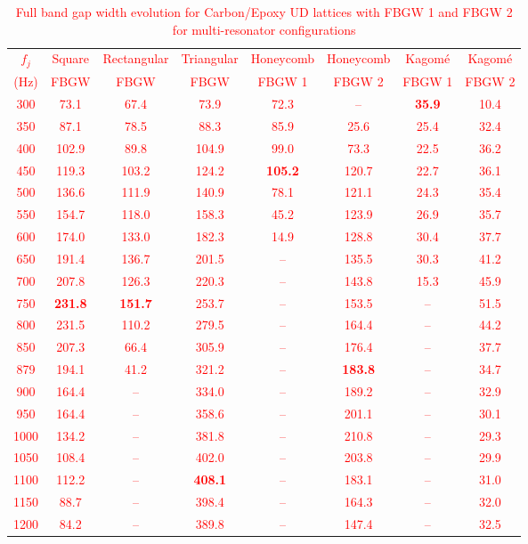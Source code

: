 \documentclass[review,numbers,sort&compress]{elsarticle}
\begin{document}
\newpage
\textcolor{red}{\begin{table}[!htb]
\centering
\caption{Full band gap width evolution for Carbon/Epoxy UD lattices with FBGW 1 and FBGW 2 for multi-resonator configurations\protect\footnotemark[1]}
\label{tab:carbon_results}
\small
\begin{tabular}{cccccccc}
\hline
$f_j$ & Square & Rectangular & Triangular & Honeycomb & Honeycomb & Kagom\'{e} & Kagom\'{e} \\
(Hz) & FBGW & FBGW & FBGW & FBGW 1 & FBGW 2 & FBGW 1 & FBGW 2 \\
\hline
300 & 73.1 & 67.4 & 73.9 & 72.3 & -- & \textbf{35.9} & 10.4 \\
350 & 87.1 & 78.5 & 88.3 & 85.9 & 25.6 & 25.4 & 32.4 \\
400 & 102.9 & 89.8 & 104.9 & 99.0 & 73.3 & 22.5 & 36.2 \\
450 & 119.3 & 103.2 & 124.2 & \textbf{105.2} & 120.7 & 22.7 & 36.1 \\
500 & 136.6 & 111.9 & 140.9 & 78.1 & 121.1 & 24.3 & 35.4 \\
550 & 154.7 & 118.0 & 158.3 & 45.2 & 123.9 & 26.9 & 35.7 \\
600 & 174.0 & 133.0 & 182.3 & 14.9 & 128.8 & 30.4 & 37.7 \\
650 & 191.4 & 136.7 & 201.5 & -- & 135.5 & 30.3 & 41.2 \\
700 & 207.8 & 126.3 & 220.3 & -- & 143.8 & 15.3 & 45.9 \\
750 & \textbf{231.8} & \textbf{151.7} & 253.7 & -- & 153.5 & -- & 51.5 \\
800 & 231.5 & 110.2 & 279.5 & -- & 164.4 & -- & 44.2 \\
850 & 207.3 & 66.4 & 305.9 & -- & 176.4 & -- & 37.7 \\
879\protect\footnotemark[2] & 194.1 & 41.2 & 321.2 & -- & \textbf{183.8} & -- & 34.7 \\
900 & 164.4 & -- & 334.0 & -- & 189.2 & -- & 32.9 \\
950 & 164.4 & -- & 358.6 & -- & 201.1 & -- & 30.1 \\
1000 & 134.2 & -- & 381.8 & -- & 210.8 & -- & 29.3 \\
1050 & 108.4 & -- & 402.0 & -- & 203.8 & -- & 29.9 \\
1100 & 112.2 & -- & \textbf{408.1} & -- & 183.1 & -- & 31.0 \\
1150 & 88.7 & -- & 398.4 & -- & 164.3 & -- & 32.0 \\
1200 & 84.2 & -- & 389.8 & -- & 147.4 & -- & 32.5 \\
\hline
\end{tabular}
\end{table}}
\end{document}
